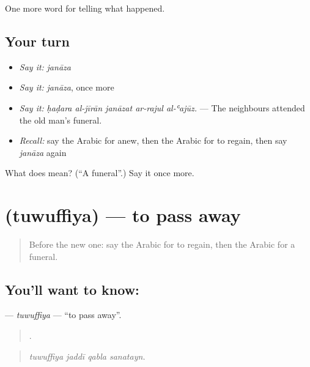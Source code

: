 \begin{grammarlens}[title={What you've built}]
One more word for telling what happened.
\end{grammarlens}

\subsection*{Your turn}
\begin{itemize}
\raggedright
  \item \emph{Say it:} \emph{janāza}
  \item \emph{Say it:} \emph{janāza}, once more
  \item \emph{Say it:} \emph{ḥaḍara al-jīrān janāzat ar-rajul al-ʿajūz.} — The neighbours attended the old man’s funeral.
  \item \emph{Recall:} say the Arabic for anew, then the Arabic for to regain, then say \emph{janāza} again
\end{itemize}

\begin{tcolorbox}[breakable,colback=teal!4,colframe=teal!35!black,title={Before you move on}]
What does  mean? (\textquotedblleft{}A funeral\textquotedblright{}.) Say it once more.
\end{tcolorbox}
\section[\texorpdfstring{\ar{توفي} (tuwuffiya)}{توفي (tuwuffiya)}]{ (tuwuffiya) — to pass away}

\label{lesson:AR-C314-tuwuffiya}



\begin{quote}
Before the new one: say the Arabic for to regain, then the Arabic for a funeral.
\end{quote}

\subsection*{You'll want to know: }
\textbf{} — \emph{tuwuffiya} — \textquotedblleft{}to pass away\textquotedblright{}.

\begin{quote}
   .
\end{quote}

\begin{quote}
\emph{tuwuffiya jaddī qabla sanatayn.}
\end{quote}


